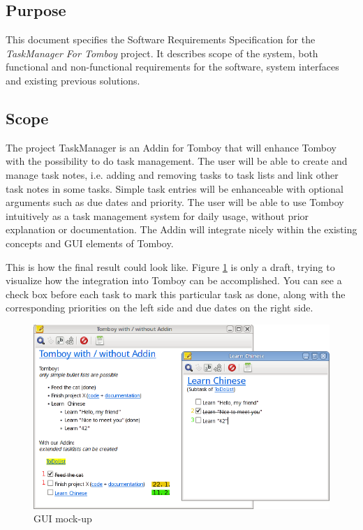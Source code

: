 \subsection{Purpose}
\label{intro:purpose}
This document specifies the Software Requirements Specification for the \textit{TaskManager For Tomboy} project.
It describes scope of the system, both functional and non-functional requirements for the software, system interfaces and existing previous solutions.


\subsection{Scope}
\label{intro:scope}
The project TaskManager is an Addin for Tomboy that will enhance Tomboy with the possibility to do task management. 
The user will be able to create and manage task notes, i.e. adding and removing tasks to task lists and link other task notes in some tasks.
Simple task entries will be enhanceable with optional arguments such as due dates and priority.
The user will be able to use Tomboy intuitively as a task management system for daily usage, without prior explanation or documentation. 
The Addin will integrate nicely within the existing concepts and GUI elements of Tomboy.

This is how the final result could look like. Figure \ref{gui} is only a draft, trying to visualize how the integration into Tomboy can be accomplished. You can see a check box before each task to mark this particular task as done, along with the corresponding priorities on the left side and due dates on the right side.
\begin{figure}[h]
  \includegraphics[width=\textwidth]{graphics/Screenshot_cropped_edited.png}
  \caption{GUI mock-up}
  \label{gui}
\end{figure}


